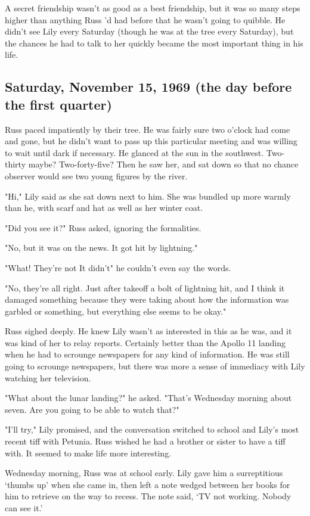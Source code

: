 A secret friendship wasn't as good as a best friendship, but it was so many steps higher than anything Russ 'd had before that he wasn't going to quibble. He didn't see Lily every Saturday (though he was at the tree every Saturday), but the chances he had to talk to her quickly became the most important thing in his life.

\subsection{Saturday, November 15, 1969 (the day before the first quarter)}

Russ paced impatiently by their tree. He was fairly sure two o'clock had come and gone, but he didn't want to pass up this particular meeting and was willing to wait until dark if necessary. He glanced at the sun in the southwest. Two-thirty maybe? Two-forty-five? Then he saw her, and sat down so that no chance observer would see two young figures by the river.

"Hi," Lily said as she sat down next to him. She was bundled up more warmly than he, with scarf and hat as well as her winter coat.

"Did you see it?" Russ asked, ignoring the formalities.

"No, but it was on the news. It got hit by lightning."

"What! They're not{\el} It didn't{\el}" he couldn't even say the words.

"No, they're all right. Just after takeoff a bolt of lightning hit, and I think it damaged something because they were taking about how the information was garbled or something, but everything else seems to be okay."

Russ sighed deeply. He knew Lily wasn't as interested in this as he was, and it was kind of her to relay reports. Certainly better than the Apollo 11 landing when he had to scrounge newspapers for any kind of information. He was still going to scrounge newspapers, but there was more a sense of immediacy with Lily watching her television.

"What about the lunar landing?" he asked. "That's{\el} Wednesday morning about seven. Are you going to be able to{\el} watch that?"

"I'll try," Lily promised, and the conversation switched to school and Lily's most recent tiff with Petunia. Russ wished he had a brother or sister to have a tiff with. It seemed to make life more interesting.

Wednesday morning, Russ was at school early. Lily gave him a surreptitious `thumbs up' when she came in, then left a note wedged between her books for him to retrieve on the way to recess. The note said, `TV not working. Nobody can see it.'

